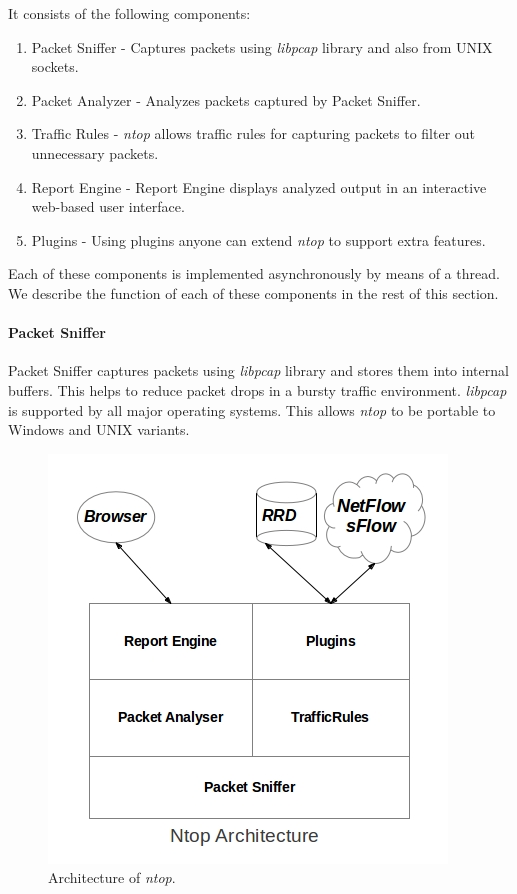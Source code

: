 It consists of the following components:
    \begin{enumerate}
     \item Packet Sniffer - Captures packets using \emph{libpcap} library and also from UNIX sockets.
     \item Packet Analyzer - Analyzes packets captured by Packet Sniffer.
     \item Traffic Rules - \emph{ntop} allows traffic rules for capturing packets to filter out unnecessary packets.
     \item Report Engine - Report Engine displays analyzed output in an interactive web-based user interface. 
     \item Plugins - Using plugins anyone can extend \emph{ntop} to support extra features.
    \end{enumerate}

    Each of these components is implemented asynchronously by means of a thread.  We describe the function of each of these components in the rest of this section.

  \paragraph{Packet Sniffer}

	Packet Sniffer captures packets using \emph{libpcap} library and stores them into internal buffers. This helps to reduce packet drops in a bursty traffic environment. \emph{libpcap} is supported by all major operating systems. This allows \emph{ntop} to be portable to Windows and UNIX variants.

        \begin{figure}[htb]
          \centering
          \includegraphics[scale=.5]{ntoparc.jpg}
          \caption{Architecture of \emph{ntop}.} 
          \label{ntop_architecture}
        \end{figure}

